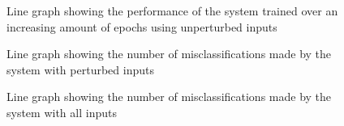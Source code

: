 \begin{table}[h]
	\centering
	\caption{Table showing the best results of the \ac{AV} prediction \ac{SNN} using perturbed images, trained for 700 epochs}
	\label{tbl:sign-respertbest}
\end{table}

\begin{figure}[t]
	\centering
	\scalebox{1}{}
	\caption{Line graph showing the performance of the system trained over an increasing amount of epochs using unperturbed inputs \label{fig:sign-graph}}
\end{figure}

\begin{figure}[t]
	\centering
	\scalebox{1}{}
	\caption{Line graph showing the number of misclassifications made by the system with perturbed inputs \label{fig:sign-graphpert}}
\end{figure}

\begin{figure}[t]
	\centering
	\scalebox{1}{}
	\caption{Line graph showing the number of misclassifications made by the system with all inputs \label{fig:sign-graphboth}}
\end{figure}

